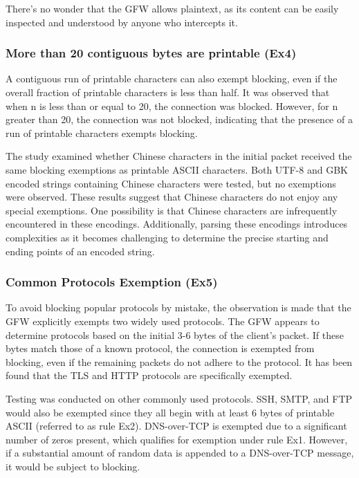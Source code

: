 There's no wonder that the GFW allows plaintext, as its content can be easily inspected and understood by anyone who intercepts it.

\subsubsection{\textbf{More than 20 contiguous bytes are printable (Ex4)}}
A contiguous run of printable characters can also exempt blocking, even if the overall fraction of printable characters is less than half. It was observed that when n is less than or equal to 20, the connection was blocked. However, for n greater than 20, the connection was not blocked, indicating that the presence of a run of printable characters exempts blocking.

The study examined whether Chinese characters in the initial packet received the same blocking exemptions as printable ASCII characters. Both UTF-8 and GBK encoded strings containing Chinese characters were tested, but no exemptions were observed. These results suggest that Chinese characters do not enjoy any special exemptions. One possibility is that Chinese characters are infrequently encountered in these encodings. Additionally, parsing these encodings introduces complexities as it becomes challenging to determine the precise starting and ending points of an encoded string.

\subsubsection{\textbf{Common Protocols Exemption (Ex5)}}
To avoid blocking popular protocols by mistake, the observation is made that the GFW explicitly exempts two widely used protocols. The GFW appears to determine protocols based on the initial 3-6 bytes of the client's packet. If these bytes match those of a known protocol, the connection is exempted from blocking, even if the remaining packets do not adhere to the protocol. It has been found that the TLS and HTTP protocols are specifically exempted.

Testing was conducted on other commonly used protocols. SSH, SMTP, and FTP would also be exempted since they all begin with at least 6 bytes of printable ASCII (referred to as rule Ex2). DNS-over-TCP is exempted due to a significant number of zeros present, which qualifies for exemption under rule Ex1. However, if a substantial amount of random data is appended to a DNS-over-TCP message, it would be subject to blocking.

